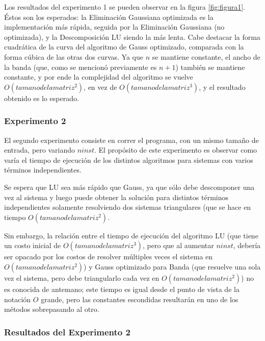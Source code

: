 \par Los resultados del experimento 1 se pueden observar en la figura \ref{fig:figura1}. \'Estos son los esperados: la Eliminaci\'on Gaussiana optimizada es la implementaci\'on m\'as r\'apida, seguida por la Eliminaci\'on Gaussiana (no optimizada), y la Descomposici\'on LU siendo la m\'as lenta.
Cabe destacar la forma cuadr\'atica de la curva del algoritmo de Gauss optimizado, comparada con la forma c\'ubica de las otras dos curvas. 
Ya que $n$ se mantiene constante, el ancho de la banda (que, como se mencion\'o previamente es $n+1$) tambi\'en se mantiene constante, y por ende la complejidad del algoritmo se vuelve $O(tamano de la matriz^2)$, en vez de $O(tamano de la matriz^3)$, y el resultado obtenido es lo esperado.

\FloatBarrier

\subsubsection{Experimento 2}

\par El segundo experimento consiste en correr el programa, con un mismo tama\~no de entrada, pero variando $ninst$. 
El prop\'osito de este experimento es observar como var\'ia el tiempo de ejecuci\'on de los distintos algoritmos para sistemas con varios t\'erminos independientes.
\par Se espera que LU sea m\'as r\'apido que Gauss, ya que s\'olo debe descomponer una vez al sistema y luego puede obtener la soluci\'on para distintos t\'erminos independientes solamente resolviendo
dos sistemas triangulares (que se hace en tiempo $O(tamano de la matriz^2)$. 
\par Sin embargo, la relaci\'on entre el tiempo de ejecuci\'on del algoritmo LU (que tiene un costo inicial de $O(tamano de la matriz^3)$, pero que al aumentar $ninst$, deber\'ia ser opacado por los costos de resolver m\'ultiples veces el sistema en $O(tamano de la matriz^2)$) y Gauss optimizado para Banda (que resuelve una sola vez el sistema, pero debe triangularlo cada vez en $O(tamano de la matriz^2)$) no es conocida de antemano; este tiempo es igual desde el punto de vista de la notaci\'on $O$ grande, pero las constantes escondidas resultar\'an en uno de los m\'etodos sobrepasando al otro.
\FloatBarrier

\subsubsection{Resultados del Experimento 2}


